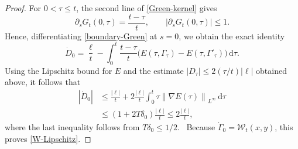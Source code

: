 \documentclass[11pt]{article}
\newcommand{\norm}[1]{\left\lVert #1\right\rVert}
\newcommand{\dd}{\,\mathrm d}
\begin{document}
\begin{proof}
For $0<\tau\leq t$, the second line of \eqref{Green-kernel} gives
\begin{equation*}
 \partial_sG_t(0,\tau)=\frac{t-\tau}{t},
 \qquad |\partial_sG_t(0,\tau)|\leq1.
\end{equation*}
Hence, differentiating \eqref{boundary-Green} at $s=0$, we obtain
the exact identity
\begin{equation*}
 \dot D_0=\frac{\ell}{t}
 -\int_0^t\frac{t-\tau}{t}
 \bigl(E(\tau,\Gamma_\tau)-E(\tau,\Gamma'_\tau)\bigr)\dd\tau.
\end{equation*}
Using the Lipschitz bound for $E$ and the estimate
$|D_\tau|\leq2(\tau/t)|\ell|$ obtained above, it follows that
\begin{align*}
 |\dot D_0|
 &\leq\frac{|\ell|}{t}
 +2\frac{|\ell|}{t}
   \int_0^t\tau\norm{\nabla E(\tau)}_{L^\infty}\dd\tau\\
 &\leq(1+2T\delta_0)\frac{|\ell|}{t}
 \leq2\frac{|\ell|}{t},
\end{align*}
where the last inequality follows from $T\delta_0\leq1/2$.
\
Because $\dot\Gamma_0=\mathcal W_t(x,y)$, this proves
\eqref{W-Lipschitz}.


\end{proof}
\end{document}
